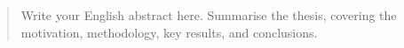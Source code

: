 \large
\renewcommand{\abstractname}{Abstract}
\begin{abstract}
{}
\normalsize

Write your English abstract here. Summarise the thesis, covering the
motivation, methodology, key results, and conclusions.

\end{abstract}
\normalsize
\clearpage
